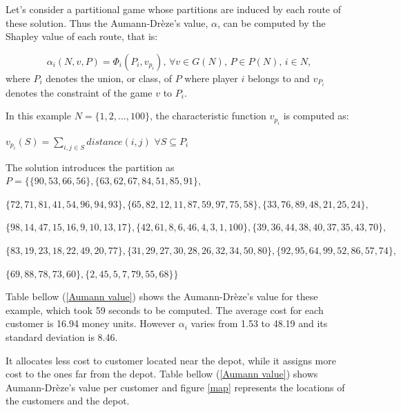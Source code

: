 Let's consider a partitional game whose partitions are induced by each route of these solution. Thus the Aumann-Dr\`eze's value, $\alpha$, can be computed by the Shapley value of each route, that is:

$$\alpha_i (N,v,P) = \Phi_{i}(P_i, v_{p_{i}}) \text{, } \forall v \in G(N) \text{, } P \in P(N) \text{, } i \in N,$$
where $P_{i}$ denotes the union, or class, of $P$ where player $i$ belongs to and $v_{P_{i}}$ denotes the constraint of the game $v$ to $P_i$.

In this example $N = \{1, 2, \dots , 100 \}$, the characteristic function $v_{p_{i}}$ is computed as:

$v_{p_{i}}(S) = \sum_{i,j \in S} distance(i,j)$ $ \forall S \subseteq P_i$

The solution introduces the partition as $P = \{ \{90, 53, 66, 56\},\{63, 62, 67, 84, 51, 85, 91\},$

$\{72, 71, 81, 41, 54, 96, 94, 93\}, \{65, 82, 12, 11, 87, 59, 97, 75, 58\},\{33, 76, 89, 48, 21, 25, 24\},$

$\{98, 14, 47, 15, 16, 9, 10, 13, 17\}, \{42, 61, 8, 6, 46, 4, 3, 1, 100\},\{39, 36, 44, 38, 40, 37, 35, 43, 70\}, $

$\{83, 19, 23, 18, 22, 49, 20, 77\}, \{31, 29, 27, 30, 28, 26, 32, 34, 50, 80\},\{92, 95, 64, 99, 52, 86, 57, 74\},$

$\{69, 88, 78, 73, 60\},\{2, 45, 5, 7, 79, 55, 68\}\}$

Table bellow (\ref{Aumann value}) shows the Aumann-Dr\`eze's value for these example, which took 59 seconds to be computed. The average cost for each customer is 16.94 money units. However $\alpha_i$ varies from 1.53 to 48.19 and its standard deviation is 8.46.

It allocates less cost to customer located near the depot, while it assigns more cost to the ones far from the depot. Table bellow (\ref{Aumann value}) shows Aumann-Dr\`eze's value per customer and figure \ref{map} represents the locations of the customers and the depot.

